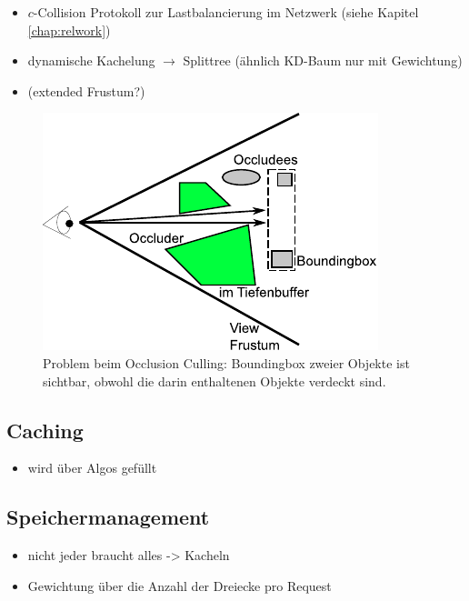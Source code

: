 \begin{itemize}
  \item $c$-Collision Protokoll zur Lastbalancierung im Netzwerk \label{sec:basics:algos:ccollision} (siehe Kapitel \ref{chap:relwork})
  \item dynamische Kachelung $\rightarrow$ Splittree (ähnlich KD-Baum nur mit Gewichtung)
  \item (extended Frustum?)
\end{itemize}
\begin{figure}
  \centering
  \includegraphics[scale=0.8]{images/oculling.pdf}
  \caption{Problem beim Occlusion Culling: Boundingbox zweier Objekte ist sichtbar, obwohl die darin enthaltenen Objekte verdeckt sind.}
  \label{fig:basics:oculling}
\end{figure}

\subsection{Caching}
\label{sec:basics:caching}
\begin{itemize}
 \item wird über Algos gefüllt
\end{itemize}

\subsection{Speichermanagement}
\label{sec:basics:speichermanagement}
\begin{itemize}
 \item nicht jeder braucht alles -> Kacheln
 \item Gewichtung über die Anzahl der Dreiecke pro Request
\end{itemize}

